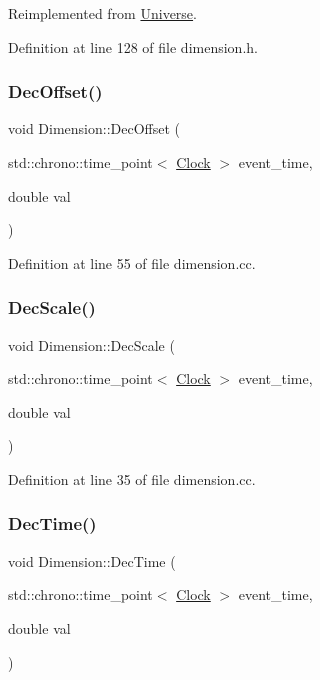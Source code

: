 Reimplemented from \hyperlink{class_universe_a46a906baabb63e5d31f8b48ea1fae52e}{Universe}.



Definition at line 128 of file dimension.\+h.

\mbox{\label{class_dimension_a2017e62d4b3caf31f4f1b6b5cf59a798}} 
\subsubsection{\texorpdfstring{Dec\+Offset()}{DecOffset()}}
{\footnotesize\ttfamily void Dimension\+::\+Dec\+Offset (\begin{DoxyParamCaption}\item[{std\+::chrono\+::time\+\_\+point$<$ \hyperlink{universe_8h_a0ef8d951d1ca5ab3cfaf7ab4c7a6fd80}{Clock} $>$}]{event\+\_\+time,  }\item[{double}]{val }\end{DoxyParamCaption})}



Definition at line 55 of file dimension.\+cc.

\mbox{\label{class_dimension_a4bd8e584c3bb68ebd7ca0463f8905813}} 
\subsubsection{\texorpdfstring{Dec\+Scale()}{DecScale()}}
{\footnotesize\ttfamily void Dimension\+::\+Dec\+Scale (\begin{DoxyParamCaption}\item[{std\+::chrono\+::time\+\_\+point$<$ \hyperlink{universe_8h_a0ef8d951d1ca5ab3cfaf7ab4c7a6fd80}{Clock} $>$}]{event\+\_\+time,  }\item[{double}]{val }\end{DoxyParamCaption})}



Definition at line 35 of file dimension.\+cc.

\mbox{\label{class_dimension_a25978bcb1f62aa7ed909463d08d92ca4}} 
\subsubsection{\texorpdfstring{Dec\+Time()}{DecTime()}}
{\footnotesize\ttfamily void Dimension\+::\+Dec\+Time (\begin{DoxyParamCaption}\item[{std\+::chrono\+::time\+\_\+point$<$ \hyperlink{universe_8h_a0ef8d951d1ca5ab3cfaf7ab4c7a6fd80}{Clock} $>$}]{event\+\_\+time,  }\item[{double}]{val }\end{DoxyParamCaption})}



